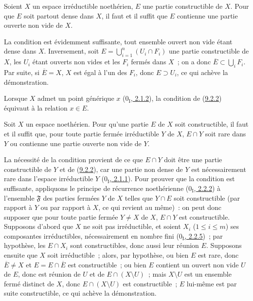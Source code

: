 \begin{proposition}[9.2.2]
\label{0.9.2.2-fr}
Soient $X$ un espace irréductible noethérien, $E$ une partie constructible de
$X$. Pour que $E$ soit partout dense dans $X$, il faut et il suffit que $E$
contienne une partie ouverte non vide de $X$.
\end{proposition}

La condition est évidemment suffisante, tout ensemble ouvert non vide étant
dense dans $X$. Inversement, soit
$E=\bigcup_{i=1}^n(U_i\cap F_i)$ une partie constructible de $X$, les $U_i$
étant ouverts non vides et les $F_i$ fermés dans $X$~; on a donc
$\overline{E}\subset\bigcup_i F_i$. Par suite, si $\overline{E}=X$, $X$ est
égal à l'un des $F_i$, donc $E\supset U_i$, ce qui achève la démonstration.

Lorsque $X$ admet un point générique $x$
(\hyperref[0.2.1.2-fr]{$0_{\mathrm I}$, 2.1.2}), la condition de
(\hyperref[0.9.2.2-fr]{9.2.2}) équivaut à la relation $x\in E$.

\begin{proposition}[9.2.3]
\label{0.9.2.3-fr}
Soit $X$ un espace noethérien. Pour qu'une partie $E$ de $X$ soit
constructible, il faut et il suffit que, pour toute partie fermée
irréductible $Y$ de $X$, $E\cap Y$ soit rare dans $Y$ ou contienne une partie
ouverte non vide de $Y$.
\end{proposition}

La nécessité de la condition provient de ce que $E\cap Y$ doit être une
partie constructible de $Y$ et de (\hyperref[0.9.2.2-fr]{9.2.2}), car une
partie non dense de $Y$ est nécessairement rare dans l'espace irréductible
$Y$ (\hyperref[0.2.1.1-fr]{$0_{\mathrm I}$, 2.1.1}). Pour prouver que la
condition est suffisante, appliquons le principe de récurrence noethérienne
(\hyperref[0.2.2.2-fr]{$0_{\mathrm I}$, 2.2.2}) à l'ensemble
$\mathfrak{F}$ des parties fermées $Y$ de $X$ telles que $Y\cap E$ soit
constructible (par rapport à $Y$ ou par rapport à $X$, ce qui revient au
même)~: on peut donc supposer que pour toute partie fermée $Y\ne X$ de $X$,
$E\cap Y$ est constructible. Supposons d'abord que $X$ ne soit pas
irréductible, et soient $X_i$ ($1\leq i\leq m$) ses composantes
irréductibles, nécessairement en nombre fini
(\hyperref[0.2.2.5-fr]{$0_{\mathrm I}$, 2.2.5})~; par hypothèse, les
$E\cap X_i$ sont constructibles, donc aussi leur réunion $E$. Supposons
ensuite que $X$ soit irréductible~; alors, par hypothèse, ou bien $E$ est
rare, donc $\overline{E}\ne X$ et $E=E\cap\overline{E}$ est constructible~;
ou bien $E$ contient un ouvert non vide $U$ de $E$, donc est réunion de $U$
et de $E\cap(X\setminus U)$~; mais $X\setminus U$ est un ensemble fermé
distinct de $X$, donc $E\cap(X\setminus U)$ est constructible~; $E$
lui-même est par suite constructible, ce qui achève la démonstration.

